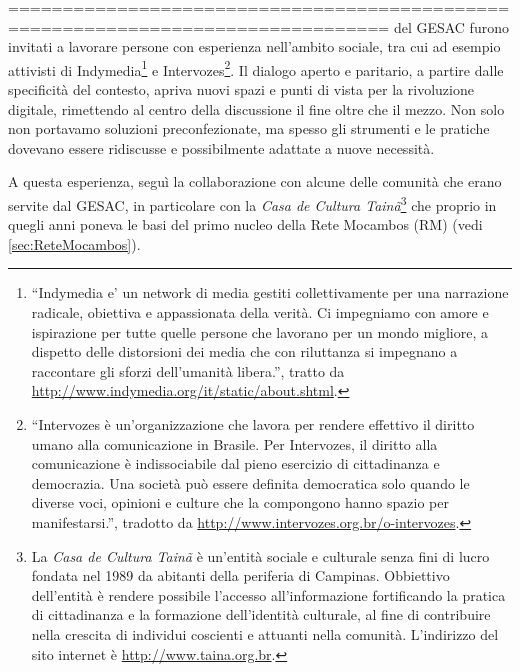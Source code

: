 =================================================================================
  del GESAC furono invitati a lavorare persone con esperienza
  nell'ambito sociale, tra cui ad esempio attivisti di
  Indymedia\footnote{``Indymedia e' un network di media gestiti
    collettivamente per una narrazione radicale, obiettiva e
    appassionata della verità. Ci impegniamo con amore e ispirazione
    per tutte quelle persone che lavorano per un mondo migliore, a
    dispetto delle distorsioni dei media che con riluttanza si
    impegnano a raccontare gli sforzi dell'umanità libera.'', tratto
    da \url{http://www.indymedia.org/it/static/about.shtml}.} e
  Intervozes\footnote{``Intervozes è un'organizzazione che lavora per
    rendere effettivo il diritto umano alla comunicazione in Brasile.
    Per Intervozes, il diritto alla comunicazione è indissociabile dal
    pieno esercizio di cittadinanza e democrazia. Una società può
    essere definita democratica solo quando le diverse voci, opinioni
    e culture che la compongono hanno spazio per manifestarsi.'',
    tradotto da \url{http://www.intervozes.org.br/o-intervozes}.}. Il
  dialogo aperto e paritario, a partire dalle specificità del
  contesto, apriva nuovi spazi e punti di vista per la rivoluzione
  digitale, rimettendo al centro della discussione il fine oltre che
  il mezzo. Non solo non portavamo soluzioni preconfezionate, ma
  spesso gli strumenti e le pratiche dovevano essere ridiscusse e
  possibilmente adattate a nuove necessità.

A questa esperienza, seguì la collaborazione con alcune delle comunità
che erano servite dal GESAC, in particolare con la \emph{Casa de
  Cultura Tainã}\footnote{La \emph{Casa de Cultura Tainã} è un'entità
  sociale e culturale senza fini di lucro fondata nel 1989 da abitanti
  della periferia di Campinas. Obbiettivo dell'entità è rendere
  possibile l'accesso all'informazione fortificando la pratica di
  cittadinanza e la formazione dell'identità culturale, al fine di
  contribuire nella crescita di individui coscienti e attuanti nella
  comunità. L'indirizzo del sito internet è
  \url{http://www.taina.org.br}.} che proprio in quegli anni poneva le
basi del primo nucleo della Rete Mocambos (RM) (vedi
\ref{sec:ReteMocambos}). 


